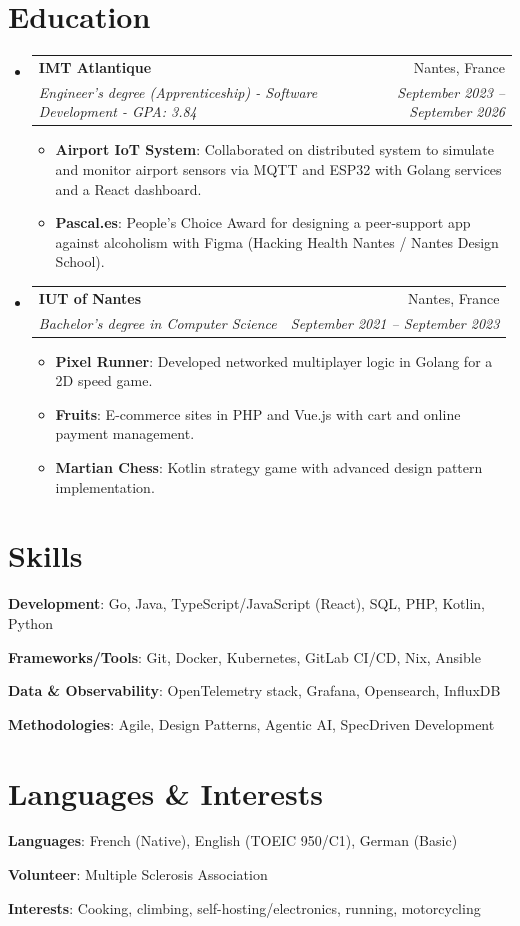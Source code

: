 \documentclass[letterpaper,11pt]{article}
\makeatletter
\newcommand{\resumeItem}[2]{
  \item\small{
    \begin{minipage}[t]{\dimexpr\linewidth-2em\relax}
    \textbf{#1}{: #2 \vspace{-2pt}}
    \end{minipage}
  }
}
\newcommand{\resumeIndentedLine}[2]{
  \noindent\hspace*{8pt}\parbox[t]{\dimexpr\linewidth-2em\relax}{\textbf{#1}: #2\vspace{2pt}}
}
\newcommand{\resumeSubheading}[4]{
  \vspace{-1pt}\item
    \begin{tabular*}{0.97\textwidth}[t]{l@{\extracolsep{\fill}}r}
      \textbf{#1} & #2 \\
      \textit{\small #3} & \textit{\small #4} \\
    \end{tabular*}\vspace{-6pt}
}
\newcommand{\resumeSubHeadingListStart}{\begin{itemize}[leftmargin=*]}
\newcommand{\resumeSubHeadingListEnd}{\end{itemize}}
\newcommand{\resumeItemListStart}{\begin{itemize}}
\newcommand{\resumeItemListEnd}{\end{itemize}\vspace{-6pt}}
\makeatother
\begin{document}
\section{Education}
  \resumeSubHeadingListStart
    \resumeSubheading
      {IMT Atlantique}{Nantes, France}
      {Engineer's degree (Apprenticeship) - Software Development - GPA: 3.84}{September 2023 -- September 2026}
      \resumeItemListStart
        \resumeItem{Airport IoT System}{Collaborated on distributed system to simulate and monitor airport sensors via MQTT and ESP32 with Golang services and a React dashboard.}
        \resumeItem{Pascal.es}{People's Choice Award for designing a peer-support app against alcoholism with Figma (Hacking Health Nantes / Nantes Design School).}
    \resumeItemListEnd
    \resumeSubheading
      {IUT of Nantes}{Nantes, France}
      {Bachelor's degree in Computer Science}{September 2021 -- September 2023}
      \resumeItemListStart
        \resumeItem{Pixel Runner}{Developed networked multiplayer logic in Golang for a 2D speed game.}
        \resumeItem{Fruits}{E-commerce sites in PHP and Vue.js with cart and online payment management.}
        \resumeItem{Martian Chess}{Kotlin strategy game with advanced design pattern implementation.}
      \resumeItemListEnd
    \resumeSubHeadingListEnd

\noindent
\begin{minipage}[t]{0.48\textwidth}
\raggedright
\section{Skills}
\small{
\resumeIndentedLine{Development}{Go, Java, TypeScript/JavaScript (React), SQL, PHP, Kotlin, Python}
\resumeIndentedLine{Frameworks/Tools}{Git, Docker, Kubernetes, GitLab CI/CD, Nix, Ansible}
\resumeIndentedLine{Data \& Observability}{OpenTelemetry stack, Grafana, Opensearch, InfluxDB}
\resumeIndentedLine{Methodologies}{Agile, Design Patterns, Agentic AI, SpecDriven Development}
}
\end{minipage}
\hfill
\begin{minipage}[t]{0.48\textwidth}
\raggedright
\section{Languages \& Interests}
\small{
\resumeIndentedLine{Languages}{French (Native), English (TOEIC 950/C1), German (Basic)}
\resumeIndentedLine{Volunteer}{Multiple Sclerosis Association}
\resumeIndentedLine{Interests}{Cooking, climbing, self-hosting/electronics, running, motorcycling}
}
\end{minipage}
\end{document}
